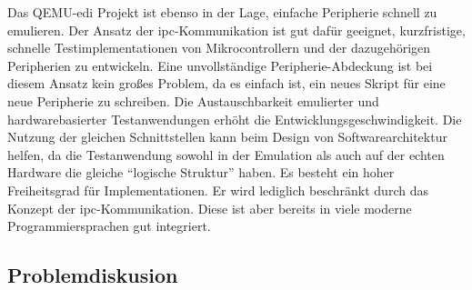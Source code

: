 Das QEMU-\ac{edi} Projekt ist ebenso in der Lage, einfache Peripherie schnell
zu emulieren.
Der Ansatz der \ac{ipc}-Kommunikation ist gut dafür geeignet, kurzfristige,
schnelle Testimplementationen von Mikrocontrollern und der dazugehörigen
Peripherien zu entwickeln.
Eine unvollständige Peripherie-Abdeckung ist bei diesem Ansatz kein großes
Problem, da es einfach ist, ein neues Skript für eine neue Peripherie zu
schreiben.
Die Austauschbarkeit emulierter und hardwarebasierter Testanwendungen erhöht die
Entwicklungsgeschwindigkeit.
Die Nutzung der gleichen Schnittstellen kann beim Design von
Softwarearchitektur helfen, da die Testanwendung sowohl in der Emulation als
auch auf der echten Hardware die gleiche \enquote{logische Struktur} haben.
Es besteht ein hoher Freiheitsgrad für Implementationen.
Er wird lediglich beschränkt durch das Konzept der \ac{ipc}-Kommunikation.
Diese ist aber bereits in viele moderne Programmiersprachen gut integriert.

\subsection{Problemdiskusion}

